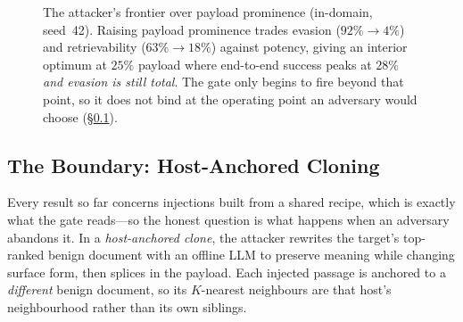 \documentclass[10pt,journal,compsoc]{IEEEtran}
\begin{document}
\begin{figure}[t]
\centering
{}
\caption{The attacker's frontier over payload prominence (in-domain, seed~42). Raising payload
prominence trades evasion ($92\%\!\to\!4\%$) and retrievability ($63\%\!\to\!18\%$) against
potency, giving an interior optimum at $25\%$ payload where end-to-end success peaks at $28\%$
\emph{and evasion is still total}. The gate only begins to fire beyond that point, so it does
not bind at the operating point an adversary would choose (\S\ref{subsec:boundary}).}
\label{fig:frontier}
\end{figure}

\subsection{The Boundary: Host-Anchored Cloning}
\label{subsec:boundary}
Every result so far concerns injections built from a shared recipe, which is exactly what the
gate reads---so the honest question is what happens when an adversary abandons it. In a
\emph{host-anchored clone}, the attacker rewrites the target's top-ranked benign document with an
offline LLM to preserve meaning while changing surface form, then splices in the payload. Each
injected passage is anchored to a \emph{different} benign document, so its $K$-nearest
neighbours are that host's neighbourhood rather than its own siblings.
\end{document}
